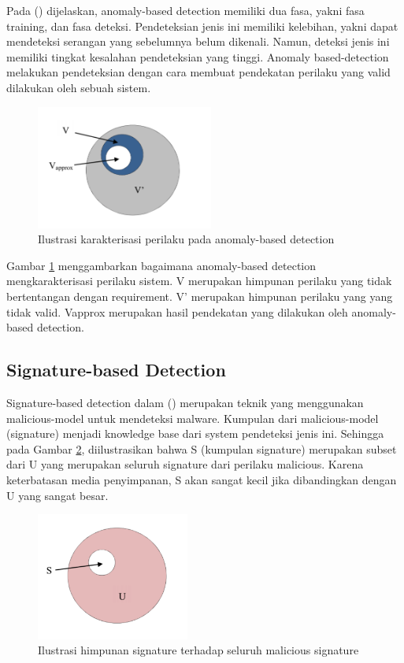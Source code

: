 Pada (\cite{idika2007survey}) dijelaskan, anomaly-based detection memiliki dua fasa, yakni fasa training, dan fasa deteksi. Pendeteksian jenis ini memiliki kelebihan, yakni dapat mendeteksi serangan yang sebelumnya belum dikenali. Namun, deteksi jenis ini memiliki tingkat kesalahan pendeteksian yang tinggi. Anomaly based-detection melakukan pendeteksian dengan cara membuat pendekatan perilaku yang valid dilakukan oleh sebuah sistem.

\begin{figure}[H]
	\centering
	\includegraphics[width=220px]{resources/anomaly_illustration.png}
	\caption{Ilustrasi karakterisasi perilaku pada anomaly-based detection}
	\label{fig:anomaly_illust}
\end{figure}

Gambar \ref{fig:anomaly_illust} menggambarkan bagaimana anomaly-based detection mengkarakterisasi perilaku sistem. V merupakan himpunan perilaku yang tidak bertentangan dengan requirement. V’ merupakan himpunan perilaku yang yang tidak valid. Vapprox merupakan hasil pendekatan yang dilakukan oleh anomaly-based detection.

\subsection{Signature-based Detection}
Signature-based detection dalam (\cite{idika2007survey}) merupakan teknik yang menggunakan malicious-model untuk mendeteksi malware. Kumpulan dari malicious-model (signature) menjadi knowledge base dari system pendeteksi jenis ini. Sehingga pada Gambar \ref{fig:signature_illust}, diilustrasikan bahwa S (kumpulan signature) merupakan subset dari U yang merupakan seluruh signature dari perilaku malicious. Karena keterbatasan media penyimpanan, S akan sangat kecil jika dibandingkan dengan U yang sangat besar.

\begin{figure}[H]
	\centering
	\includegraphics[width=190px]{resources/signature_illustration.png}
	\caption{Ilustrasi himpunan signature terhadap seluruh malicious signature}
	\label{fig:signature_illust}
\end{figure}

